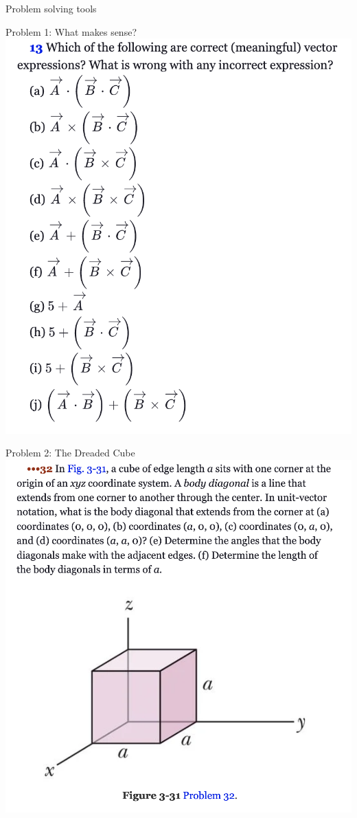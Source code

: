   \begin{frame}{Problem solving tools}
\small

\end{frame}

  \begin{frame}{Problem 1: What makes sense?}
\small
\includegraphics[scale=0.34]{whichmakesense}
\end{frame}

  \begin{frame}{Problem 2: The Dreaded Cube}
\small
\includegraphics[scale=0.34]{dreadedcube}
\end{frame}




